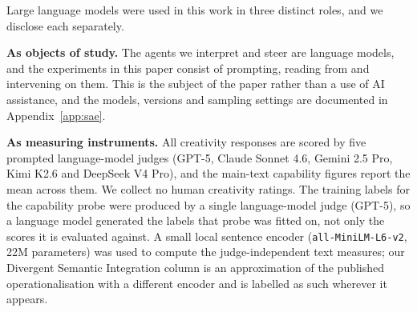 
Large language models were used in this work in three distinct roles, and we
disclose each separately.

\textbf{As objects of study.} The agents we interpret and steer are language
models, and the experiments in this paper consist of prompting, reading from and
intervening on them. This is the subject of the paper rather than a use of AI
assistance, and the models, versions and sampling settings are documented in
Appendix~\ref{app:sae}.

\textbf{As measuring instruments.} All creativity responses are scored by five
prompted language-model judges (GPT-5, Claude Sonnet 4.6, Gemini 2.5 Pro,
Kimi K2.6 and DeepSeek V4 Pro), and the main-text capability figures report the
mean across them. We collect no human creativity ratings. The training labels
for the capability probe were produced by a single language-model judge (GPT-5),
so a language model generated the labels that probe was fitted on, not only the
scores it is evaluated against. A small local sentence encoder
(\texttt{all-MiniLM-L6-v2}, 22M parameters) was used to compute the
judge-independent text measures; our Divergent Semantic Integration column is an
approximation of the published operationalisation with a different encoder and is
labelled as such wherever it appears.

